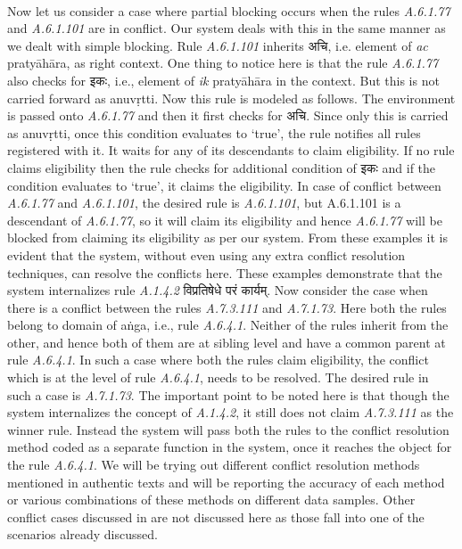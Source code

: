 \documentclass[11pt]{article}
\begin{document}
\\
Now let us consider a case where partial blocking occurs when the rules {\sl A.6.1.77} and {\sl A.6.1.101} are in conflict. Our system deals with this in the same manner as we dealt with simple blocking. Rule {\sl A.6.1.101} inherits {\skt अचि}, i.e. element of {\sl ac} pratyāhāra, as right context. One thing to notice here is that the rule {\sl A.6.1.77} also checks for {\skt इकः}, i.e., element of {\sl ik} pratyāhāra in the context. But this is not carried forward as anuvṛtti. Now this rule is modeled as follows. The environment is passed onto {\sl A.6.1.77} and then it first checks for {\skt अचि}. Since only this is carried as anuvṛtti, once this condition evaluates to `true', the rule notifies all rules registered with it. It waits for any of its descendants to claim eligibility. If no rule claims eligibility then the rule checks for additional condition of {\skt इकः} and if the condition evaluates to `true', it claims the eligibility. In case of conflict between {\sl A.6.1.77} and {\sl A.6.1.101}, the desired rule is {\sl A.6.1.101}, but A.6.1.101 is a descendant of {\sl A.6.1.77}, so it will claim its eligibility and hence {\sl A.6.1.77} will be blocked from claiming its eligibility as per our system. From these examples it is evident that the system, without even using any extra conflict resolution techniques, can resolve the conflicts here. These examples demonstrate that the system internalizes rule {\sl A.1.4.2} {\skt विप्रतिषेधे परं कार्यम्}. Now consider the case when there is a conflict between the rules {\sl A.7.3.111} and {\sl A.7.1.73}. Here both the rules belong to domain of aṅga, i.e., rule {\sl A.6.4.1}. Neither of the rules inherit from the other, and hence both of them are at sibling level and have a common parent at rule {\sl A.6.4.1}. In such a case where both the rules claim eligibility, the conflict which is at the level of rule {\sl A.6.4.1}, needs to be resolved. The desired rule in such a case is {\sl A.7.1.73}. The important point to be noted here is that though the system internalizes the concept of {\sl A.1.4.2}, it still does not claim {\sl A.7.3.111} as the winner rule. Instead the system will pass both the rules to the conflict resolution method coded as a separate function in the system, once it reaches the object for the rule {\sl A.6.4.1}. We will be trying out different conflict resolution methods mentioned in authentic texts and will be reporting the accuracy of each method or various combinations of these methods on different data samples. Other conflict cases discussed in  are not discussed here as those fall into one of the scenarios already discussed.
\\
\end{document}
